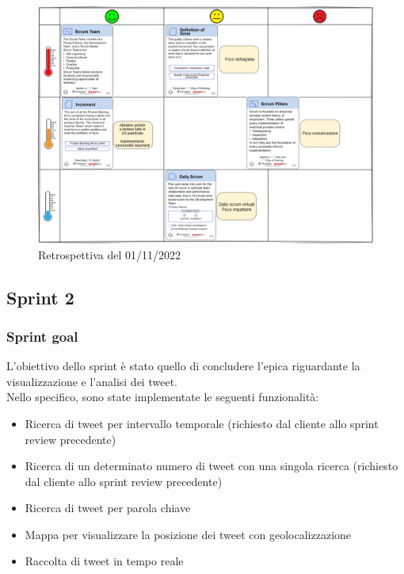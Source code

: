 \documentclass[11pt]{article}
\begin{document}
\begin{figure}[H]
    \centering
    \includegraphics[width=15cm]{./img/sprint1/retrospettiva.png}
    \caption{Retrospettiva del 01/11/2022}
\end{figure}


\subsection{Sprint 2}
\subsubsection{Sprint goal}
L'obiettivo dello sprint è stato quello di concludere l'epica riguardante la visualizzazione e l'analisi dei tweet.\\
Nello specifico, sono state implementate le seguenti funzionalità:
\begin{itemize}
    \item Ricerca di tweet per intervallo temporale (richiesto dal cliente allo sprint review precedente)
    \item Ricerca di un determinato numero di tweet con una singola ricerca (richiesto dal cliente allo sprint review precedente)
    \item Ricerca di tweet per parola chiave
    \item Mappa per visualizzare la posizione dei tweet con geolocalizzazione
    \item Raccolta di tweet in tempo reale
\end{itemize}
\end{document}
